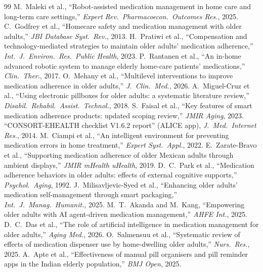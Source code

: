 \documentclass[10pt,twocolumn]{article}
\begin{document}
\begin{thebibliography}{99}
\small
{} M.\ Maleki et al., ``Robot-assisted medication management in home care and long-term care settings,'' \emph{Expert Rev.\ Pharmacoecon.\ Outcomes Res.}, 2025.
 C.\ Godfrey et al., ``Homecare safety and medication management with older adults,'' \emph{JBI Database Syst.\ Rev.}, 2013.
 H.\ Pratiwi et al., ``Compensation and technology-mediated strategies to maintain older adults' medication adherence,'' \emph{Int.\ J.\ Environ.\ Res.\ Public Health}, 2023.
 P.\ Rantanen et al., ``An in-home advanced robotic system to manage elderly home-care patients' medications,'' \emph{Clin.\ Ther.}, 2017.
 O.\ Mehany et al., ``Multilevel interventions to improve medication adherence in older adults,'' \emph{J.\ Clin.\ Med.}, 2026.
 A.\ Miguel-Cruz et al., ``Using electronic pillboxes for older adults: a systematic literature review,'' \emph{Disabil.\ Rehabil.\ Assist.\ Technol.}, 2018.
 S.\ Faisal et al., ``Key features of smart medication adherence products: updated scoping review,'' \emph{JMIR Aging}, 2023.
 ``CONSORT-EHEALTH checklist V1.6.2 report'' (ALICE app), \emph{J.\ Med.\ Internet Res.}, 2014.
 M.\ Ciampi et al., ``An intelligent environment for preventing medication errors in home treatment,'' \emph{Expert Syst.\ Appl.}, 2022.
 E.\ Zarate-Bravo et al., ``Supporting medication adherence of older Mexican adults through ambient displays,'' \emph{JMIR mHealth uHealth}, 2019.
 D.\ C.\ Park et al., ``Medication adherence behaviors in older adults: effects of external cognitive supports,'' \emph{Psychol.\ Aging}, 1992.
 J.\ Milisavljevic-Syed et al., ``Enhancing older adults' medication self-management through smart packaging,'' \emph{Int.\ J.\ Manag.\ Humanit.}, 2025.
 M.\ T.\ Akanda and M.\ Kang, ``Empowering older adults with AI agent-driven medication management,'' \emph{AHFE Int.}, 2025.
 D.\ C.\ Das et al., ``The role of artificial intelligence in medication management for older adults,'' \emph{Aging Med.}, 2026.
 O.\ Salmensuu et al., ``Systematic review of effects of medication dispenser use by home-dwelling older adults,'' \emph{Nurs.\ Res.}, 2025.
 A.\ Apte et al., ``Effectiveness of manual pill organisers and pill reminder apps in the Indian elderly population,'' \emph{BMJ Open}, 2025.

\end{thebibliography}
\end{document}
